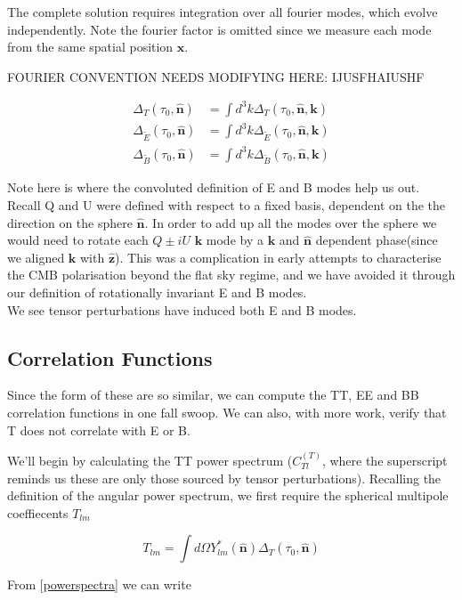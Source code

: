 \documentclass[a4paper,11pt]{article}
\renewcommand{\v}[1]{\mathbf{#1}}
\newcommand{\unit}[1]{\hat{\v{#1}}}
\begin{document}
The complete solution requires integration over all fourier modes, which evolve independently. Note the fourier factor is omitted since we measure each mode from the same spatial position $\v{x}$.

FOURIER CONVENTION NEEDS MODIFYING HERE: IJUSFHAIUSHF

\begin{align}
\Delta_T(\tau_0,\unit{n}) &= \int d^3k \Delta_T(\tau_0,\unit{n},\v{k})\\
\Delta_{\tilde{E}}(\tau_0,\unit{n}) &= \int d^3k\Delta_{\tilde{E}}(\tau_0,\unit{n},\v{k})\\
\Delta_{\tilde{B}}(\tau_0,\unit{n}) &= \int d^3k\Delta_{\tilde{B}}(\tau_0,\unit{n},\v{k})
\end{align}

Note here is where the convoluted definition of E and B modes help us out. Recall Q and U were defined with respect to a fixed basis, dependent on the the direction on the sphere $\unit{n}$. In order to add up all the modes over the sphere we would need to rotate each $Q\pm iU$ $\v{k}$ mode by a $\v{k}$ and $\unit{n}$ dependent phase(since we aligned $\v{k}$ with $\unit{z}$). This was a complication in early attempts to characterise the CMB polarisation beyond the flat sky regime, and we have avoided it through our definition of rotationally invariant E and B modes.\\

We see tensor perturbations have induced both E and B modes.

\subsection{Correlation Functions}

Since the form of these are so similar, we can compute the TT, EE and BB correlation functions in one fall swoop. We can also, with more work, verify that T does not correlate with E or B.

We'll begin by calculating the TT power spectrum ($C_{Tl}^{(T)}$, where the superscript reminds us these are only those sourced by tensor perturbations). Recalling the definition of the angular power spectrum, we first require the spherical multipole coeffiecents $T_{lm}$  

\begin{equation}
T_{lm} = \int d\Omega Y_{lm}^*(\unit{n})\Delta_T(\tau_0,\unit{n})
\end{equation}

From \ref{powerspectra} we can write 
\end{document}
